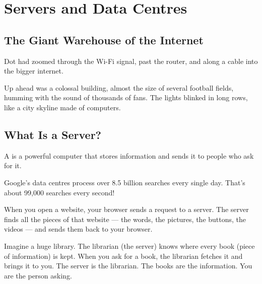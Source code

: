 
\chapter{Servers and Data Centres}


\section*{The Giant Warehouse of the Internet}

Dot had zoomed through the Wi-Fi signal, past the router,
and along a cable into the bigger internet.

Up ahead was a colossal building, almost the size of several football fields,
humming with the sound of thousands of fans.
The lights blinked in long rows, like a city skyline made of computers.


\sectionrule

\section*{What Is a Server?}

A  is a powerful computer that stores information and sends it to people who ask for it.

\begin{funfact}
Google's data centres process over 8.5 billion searches every single day. That's about 99,000 searches every second!
\end{funfact}

When you open a website, your browser sends a request to a server.
The server finds all the pieces of that website — the words, the pictures, the buttons, the videos —
and sends them back to your browser.

\begin{picturethis}
  Imagine a huge library.
  The librarian (the server) knows where every book (piece of information) is kept.
  When you ask for a book, the librarian fetches it and brings it to you.
  The server is the librarian.
  The books are the information.
  You are the person asking.
\end{picturethis}

